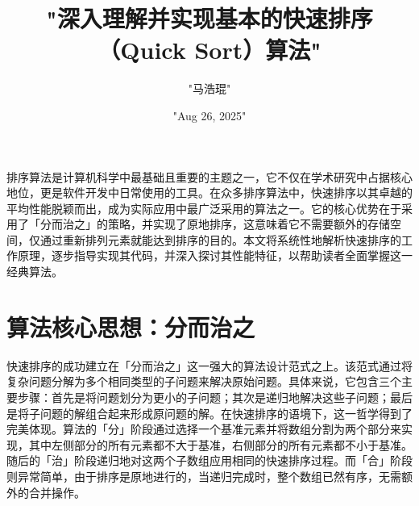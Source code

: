 \title{"深入理解并实现基本的快速排序（Quick Sort）算法"}
\author{"马浩琨"}
\date{"Aug 26, 2025"}
\maketitle
排序算法是计算机科学中最基础且重要的主题之一，它不仅在学术研究中占据核心地位，更是软件开发中日常使用的工具。在众多排序算法中，快速排序以其卓越的平均性能脱颖而出，成为实际应用中最广泛采用的算法之一。它的核心优势在于采用了「分而治之」的策略，并实现了原地排序，这意味着它不需要额外的存储空间，仅通过重新排列元素就能达到排序的目的。本文将系统性地解析快速排序的工作原理，逐步指导实现其代码，并深入探讨其性能特征，以帮助读者全面掌握这一经典算法。\par
\chapter{算法核心思想：分而治之}
快速排序的成功建立在「分而治之」这一强大的算法设计范式之上。该范式通过将复杂问题分解为多个相同类型的子问题来解决原始问题。具体来说，它包含三个主要步骤：首先是将问题划分为更小的子问题；其次是递归地解决这些子问题；最后是将子问题的解组合起来形成原问题的解。在快速排序的语境下，这一哲学得到了完美体现。算法的「分」阶段通过选择一个基准元素并将数组分割为两个部分来实现，其中左侧部分的所有元素都不大于基准，右侧部分的所有元素都不小于基准。随后的「治」阶段递归地对这两个子数组应用相同的快速排序过程。而「合」阶段则异常简单，由于排序是原地进行的，当递归完成时，整个数组已然有序，无需额外的合并操作。\par
